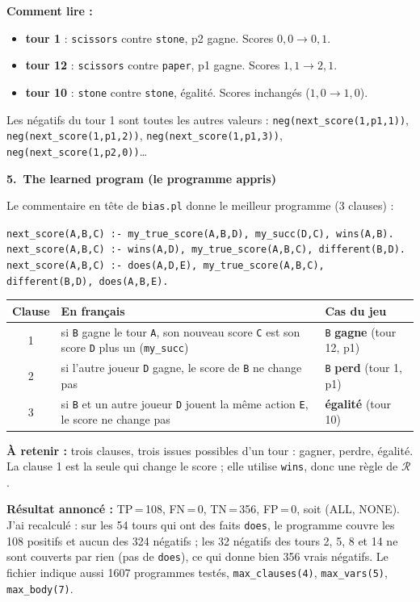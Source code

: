 \documentclass[10pt]{article}
\newcommand{\titrebox}[2]{\needspace{10\baselineskip}\vspace{8pt}
  \begin{tcolorbox}[colback=marine, colframe=marine, arc=0pt, boxrule=0pt,
    top=4pt, bottom=4pt, left=8pt]
  \color{white}\Large\bfseries #1.~#2
  \end{tcolorbox}\vspace{2pt}}
\newcommand{\ce}[1]{\begin{pourquoi}\textbf{\textcolor{marine}{À retenir :}} #1\end{pourquoi}}
\begin{document}
\textbf{Comment lire :}
\begin{itemize}
  \item \textbf{tour 1} : \texttt{scissors} contre \texttt{stone}, p2 gagne. Scores $0,0 \to 0,1$.
  \item \textbf{tour 12} : \texttt{scissors} contre \texttt{paper}, p1 gagne. Scores $1,1 \to 2,1$.
  \item \textbf{tour 10} : \texttt{stone} contre \texttt{stone}, égalité. Scores inchangés ($1,0 \to 1,0$).
\end{itemize}
Les négatifs du tour 1 sont toutes les autres valeurs : \texttt{neg(next\_score(1,p1,1))}, \texttt{neg(next\_score(1,p1,2))}, \texttt{neg(next\_score(1,p1,3))}, \texttt{neg(next\_score(1,p2,0))}\ldots

\titrebox{5}{The learned program (le programme appris)}
Le commentaire en tête de \texttt{bias.pl} donne le meilleur programme (3 clauses) :
\begin{moi}\small
\texttt{next\_score(A,B,C) :- my\_true\_score(A,B,D), my\_succ(D,C), wins(A,B).}\\
\texttt{next\_score(A,B,C) :- wins(A,D), my\_true\_score(A,B,C), different(B,D).}\\
\texttt{next\_score(A,B,C) :- does(A,D,E), my\_true\_score(A,B,C), different(B,D), does(A,B,E).}
\end{moi}
\renewcommand{\arraystretch}{1.3}
\begin{tabular}{@{}c L{6.4cm}L{7.4cm}@{}}
\textbf{Clause} & \textbf{En français} & \textbf{Cas du jeu}\\ & si \texttt{B} gagne le tour \texttt{A}, son nouveau score \texttt{C} est son score \texttt{D} plus un (\texttt{my\_succ}) & \texttt{B} \textbf{gagne} (tour 12, p1)\\
2 & si l'autre joueur \texttt{D} gagne, le score de \texttt{B} ne change pas & \texttt{B} \textbf{perd} (tour 1, p1)\\
3 & si \texttt{B} et un autre joueur \texttt{D} jouent la même action \texttt{E}, le score ne change pas & \textbf{égalité} (tour 10)\\
\end{tabular}
\ce{trois clauses, trois issues possibles d'un tour : gagner, perdre, égalité. La clause 1 est la seule qui change le score ; elle utilise \texttt{wins}, donc une règle de $\mathcal{R}$.}
\textbf{Résultat annoncé :} TP\,=\,108, FN\,=\,0, TN\,=\,356, FP\,=\,0, soit (ALL, NONE). J'ai recalculé : sur les 54 tours qui ont des faits \texttt{does}, le programme couvre les 108 positifs et aucun des 324 négatifs ; les 32 négatifs des tours 2, 5, 8 et 14 ne sont couverts par rien (pas de \texttt{does}), ce qui donne bien 356 vrais négatifs.
Le fichier indique aussi 1607 programmes testés, \texttt{max\_clauses(4)}, \texttt{max\_vars(5)}, \texttt{max\_body(7)}.
\end{document}
